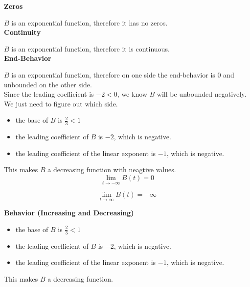 \documentclass{ximera}
\begin{document}
\begin{example}
\textbf{Zeros}

$B$ is an exponential function, therefore it has no zeros. \\





\textbf{Continuity}

$B$ is an exponential function, therefore it is continuous. \\






\textbf{End-Behavior}

$B$ is an exponential function, therefore on one side the end-behavior is $0$ and unbounded on the other side. \\


Since the leading coefficient is $-2 < 0$, we know $B$ will be unbounded negatively.  We just need to figure out which side. \\


\begin{itemize}
  \item the base of $B$ is $\frac{2}{3} < 1$
  \item the leading coefficient of $B$ is $-2$, which is negative.
  \item the leading coefficient of the linear exponent is $-1$, which is negative.
\end{itemize}


This makes $B$ a decreasing function with neagtive values. \\


\[ \lim\limits_{t \to -\infty} B(t) = 0 \]

\[ \lim\limits_{t \to \infty} B(t) = -\infty \]




\textbf{Behavior (Increasing and  Decreasing)} \\


\begin{itemize}
  \item the base of $B$ is $\frac{2}{3} < 1$
  \item the leading coefficient of $B$ is $-2$, which is negative.
  \item the leading coefficient of the linear exponent is $-1$, which is negative.
\end{itemize}


This makes $B$ a decreasing function. \\ 







\end{example}
\end{document}
